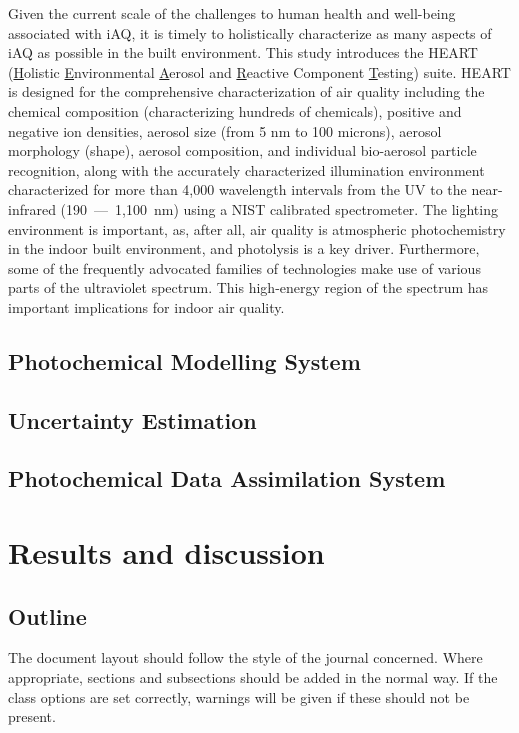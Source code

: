\documentclass[journal=jacsat,manuscript=article]{achemso}
\begin{document}
Given the current scale of the challenges to human health and well-being associated with iAQ, it is timely to holistically  characterize as many aspects of iAQ as possible in the built environment. This study introduces the HEART (\underline{H}olistic \underline{E}nvironmental \underline{A}erosol and \underline{R}eactive Component \underline{T}esting) suite. HEART is designed for the comprehensive characterization of air quality including the chemical composition (characterizing hundreds of chemicals), positive and negative ion densities, aerosol size (from 5 nm to 100 microns), aerosol morphology (shape), aerosol composition, and individual bio-aerosol particle recognition, along with the accurately characterized illumination environment characterized for more than 4,000 wavelength intervals from the UV to the near-infrared (\hbox{190 — 1,100 nm}) using a NIST calibrated spectrometer. The lighting environment is important, as, after all, air quality is atmospheric photochemistry in the indoor built environment, and photolysis is a key driver. Furthermore, some of the frequently advocated families of technologies make use of various parts of the ultraviolet spectrum. This high-energy region of the spectrum has important implications for indoor air quality.

\subsection{Photochemical Modelling System}

\subsection{Uncertainty Estimation}

\subsection{Photochemical Data Assimilation System}




\section{Results and discussion}

\subsection{Outline}

The document layout should follow the style of the journal concerned.
Where appropriate, sections and subsections should be added in the
normal way. If the class options are set correctly, warnings will be
given if these should not be present.
\end{document}
